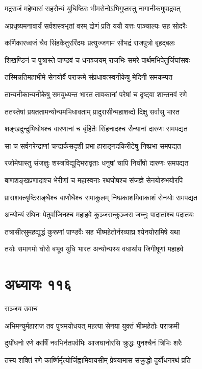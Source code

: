 \twolineshloka
{मद्रराजं महेष्वासं सहसैन्यं युधिष्ठिरः}
{भीमसेनोऽभिगुप्तस्तु नागानीकमुपाद्रवत्}


\twolineshloka
{अप्रधृष्यमनावार्यं सर्वशस्त्रभृतां वरम्}
{द्रोणं प्रति ययौ यत्तः पाञ्चाल्यः सह सोदरैः}


\twolineshloka
{कर्णिकारध्वजं चैव सिंहकैतुररिंदमः}
{प्रत्युज्जगाम सौभद्रं राजपुत्रो बृहद्बलः}


\twolineshloka
{शिखण्डिनं च पुत्रास्ते पाण्डवं च धनञ्जयम्}
{राजभिः समरे पार्थमभिपेतुर्जिघांसवः}


\twolineshloka
{तस्मिन्नतिमहाभीमे सेनयोर्वै पराक्रमे}
{संप्रधावत्स्वनीकेषु मेदिनी समकम्पत}


\twolineshloka
{तान्यनीकान्यनीकेषु समयुध्यन्त भारत}
{तावकानां परेषां च दृष्ट्वा शान्तनवं रणे}


\twolineshloka
{ततस्तेषां प्रयततामन्योन्यमभिधावताम्}
{प्रादुरासीन्महाशब्दो दिक्षु सर्वासु भारत}


\twolineshloka
{शङ्खदुन्दुभिघोषश्च वारणानां च बृंहितैः}
{सिंहनादश्च सैन्यानां दारुणः समपद्यत}


\twolineshloka
{सा च सर्वनरेन्द्राणां चन्द्रार्कसदृशी प्रभा}
{हाराङ्गदकिरीटेषु निष्प्रभा समपद्यत}


\twolineshloka
{रजोमेघास्तु संजज्ञुः शस्त्रविद्युद्भिरावृताः}
{धनुषां चापि निर्घोषो दारुणः समपद्यत}


\twolineshloka
{बाणशङ्खप्रणादाश्च भेरीणां च महास्वनाः}
{रथघोषश्च संजज्ञे सेनयोरुभयोरपि}


\twolineshloka
{प्रासशक्त्यृष्टिसङ्घैश्च बाणौघैश्च समाकुलम्}
{निष्प्रकाशमिवाकाशं सेनयोः समपद्यत}


\twolineshloka
{अन्योन्यं रथिनः पेतुर्वाजिनश्च महाहवे}
{कुञ्जरान्कुञ्जरा जघ्नुः पादातांश्च पदातयः}


\twolineshloka
{तत्रासीत्सुमहद्युद्धं कुरूणां पाण्डवैः सह}
{भीष्महेतोर्नरव्याघ्र श्येनयोरामिषे यथा}


\twolineshloka
{तयोः समागमो घोरो बभूव युधि भारत}
{अन्योन्यस्य वधार्थाय जिगीषूणां महाहवे}


\chapter{अध्यायः ११६}
\twolineshloka
{सञ्जय उवाच}
{}


\twolineshloka
{अभिमन्युर्महाराज तव पुत्रमयोधयत्}
{महत्या सेनया युक्तं भीष्महेतोः पराक्रमी}


\twolineshloka
{दुर्योधनो रणे कार्षिं नवभिर्नतपर्वभिः}
{आजघानोरसि क्रुद्धः पुनश्चैनं त्रिभिः शरैः}


\twolineshloka
{तस्य शक्तिं रणे कार्ष्णिर्मृत्योर्जिह्वामिवायसीम्}
{प्रेषयामास संक्रुद्धो दुर्योधनरथं प्रति}


